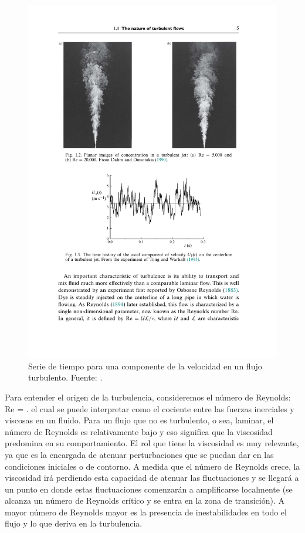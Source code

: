 \begin{figure}[h!]
	\centering
	\includegraphics[width=0.8\linewidth,trim={4.3cm 7.7cm 4cm 11.5cm},clip]{Imagenes/03/turbulent}
	\caption{Serie de tiempo para una componente de la velocidad en un flujo turbulento. Fuente: \cite{pope2000turbulent}.}
	\label{fig:03_turbulent}
\end{figure}
\newpage
Para entender el origen de la turbulencia, consideremos el número de Reynolds:
\be Re = .\ee
el cual se puede interpretar como el cociente entre las fuerzas inerciales y viscosas en un fluido. Para un flujo que no es turbulento, o sea, laminar, el número de Reynolds es relativamente bajo y eso significa que la viscosidad predomina en su comportamiento. El rol que tiene la viscosidad es muy relevante, ya que es la encargada de atenuar perturbaciones que se puedan dar en las condiciones iniciales o de contorno. A medida que el número de Reynolds crece, la viscosidad irá perdiendo esta capacidad de atenuar las fluctuaciones y se llegará a un punto en donde estas fluctuaciones comenzarán a amplificarse localmente (se alcanza un número de Reynolds crítico y se entra en la zona de transición). A mayor número de Reynolds mayor es la presencia de inestabilidades en todo el flujo y lo que deriva en la turbulencia.

